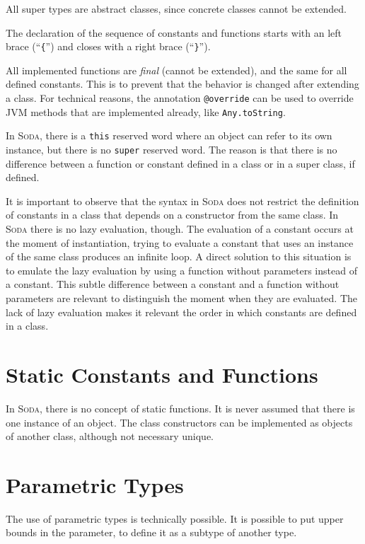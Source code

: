 \documentclass[12pt,a4paper]{book}
\makeatletter
\newcommand{\srccode}[1]{\texttt{{#1}}}
\newcommand{\reservedWord}[1]{{\color{blue}\srccode{#1}}\xspace}
\newcommand{\annotation}[1]{{\color{brown}\srccode{#1}}\xspace}
\newcommand{\sthis}{\reservedWord{this}}
\newcommand{\soverride}{\annotation{@override}}
\newcommand{\Soda}{\textsc{Soda}\xspace}
\makeatother
\begin{document}
    All super types are abstract classes, since concrete classes cannot be extended.

    The declaration of the sequence of constants and functions starts with an left brace (``\srccode{\{}'') and closes with a right brace (``\srccode{\}}'').

    All implemented functions are \textit{final} (cannot be extended), and the same for all defined constants.
    This is to prevent that the behavior is changed after extending a class.
    For technical reasons, the annotation \soverride can be used to override JVM methods that are implemented already, like \srccode{Any.toString}.

    In \Soda, there is a \sthis reserved word where an object can refer to its own instance, but there is no \srccode{super} reserved word.
    The reason is that there is no difference between a function or constant defined in a class or in a super class, if defined.

    It is important to observe that the syntax in \Soda does not restrict the definition of constants in a class that depends on a constructor from the same class.
    In \Soda there is no lazy evaluation, though.
    The evaluation of a constant occurs at the moment of instantiation, trying to evaluate a constant that uses an instance of the same class produces an infinite loop.
    A direct solution to this situation is to emulate the lazy evaluation by using a function without parameters instead of a constant.
    This subtle difference between a constant and a function without parameters are relevant to distinguish the moment when they are evaluated.
    The lack of lazy evaluation makes it relevant the order in which constants are defined in a class.


    \section{Static Constants and Functions}

    In \Soda, there is no concept of static functions.
    It is never assumed that there is one instance of an object.
    The class constructors can be implemented as objects of another class, although not necessary unique.


    \section{Parametric Types}

    The use of parametric types is technically possible.
    It is possible to put upper bounds in the parameter, to define it as a subtype of another type.
\end{document}
